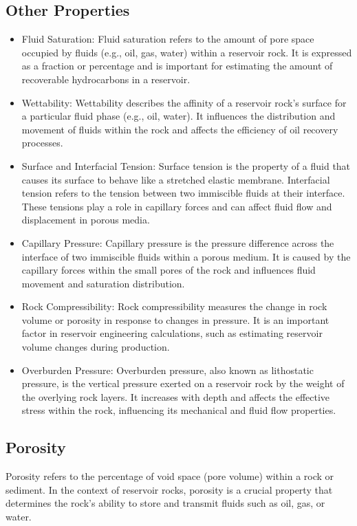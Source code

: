 \documentclass{article}
\begin{document}
\subsection*{Other Properties}
\begin{itemize}
    \item Fluid Saturation: Fluid saturation refers to the amount of pore space occupied by fluids (e.g., oil, gas, water) within a reservoir rock. It is expressed as a fraction or percentage and is important for estimating the amount of recoverable hydrocarbons in a reservoir.
    \item Wettability: Wettability describes the affinity of a reservoir rock's surface for a particular fluid phase (e.g., oil, water). It influences the distribution and movement of fluids within the rock and affects the efficiency of oil recovery processes.
    \item Surface and Interfacial Tension: Surface tension is the property of a fluid that causes its surface to behave like a stretched elastic membrane. Interfacial tension refers to the tension between two immiscible fluids at their interface. These tensions play a role in capillary forces and can affect fluid flow and displacement in porous media.
    \item Capillary Pressure: Capillary pressure is the pressure difference across the interface of two immiscible fluids within a porous medium. It is caused by the capillary forces within the small pores of the rock and influences fluid movement and saturation distribution.
    \item Rock Compressibility: Rock compressibility measures the change in rock volume or porosity in response to changes in pressure. It is an important factor in reservoir engineering calculations, such as estimating reservoir volume changes during production.
    \item Overburden Pressure: Overburden pressure, also known as lithostatic pressure, is the vertical pressure exerted on a reservoir rock by the weight of the overlying rock layers. It increases with depth and affects the effective stress within the rock, influencing its mechanical and fluid flow properties.
\end{itemize}


\subsection*{Porosity}
Porosity refers to the percentage of void space (pore volume) within a rock or sediment. In the context of reservoir rocks, porosity is a crucial property that determines the rock's ability to store and transmit fluids such as oil, gas, or water.\\
\end{document}
